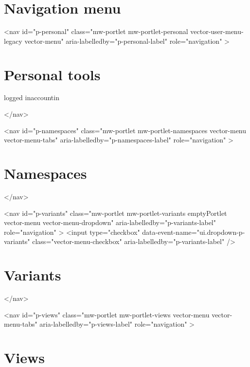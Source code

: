 \documentclass{article}\usepackage{titlesec}
\begin{document}
	



	\section{Navigation menu}
	
		<nav id="p-personal" class="mw-portlet mw-portlet-personal vector-user-menu-legacy vector-menu" aria-labelledby="p-personal-label" role="navigation" 
	 >
	\section{Personal tools}
	
		
		\begin{itemize}\itemNot logged in\itemTalk\itemContributions\itemCreate account\itemLog in\end{itemize}
		
	
</nav>

		
			<nav id="p-namespaces" class="mw-portlet mw-portlet-namespaces vector-menu vector-menu-tabs" aria-labelledby="p-namespaces-label" role="navigation" 
	 >
	\section{Namespaces}
	
		
		\begin{itemize}\itemArticle\itemTalk\end{itemize}
		
	
</nav>

			<nav id="p-variants" class="mw-portlet mw-portlet-variants emptyPortlet vector-menu vector-menu-dropdown" aria-labelledby="p-variants-label" role="navigation" 
	 >
	<input type="checkbox"
		data-event-name="ui.dropdown-p-variants"
		class="vector-menu-checkbox" aria-labelledby="p-variants-label" />
	\section{Variants}
	
		
		\begin{itemize}\end{itemize}
		
	
</nav>

		
		
			<nav id="p-views" class="mw-portlet mw-portlet-views vector-menu vector-menu-tabs" aria-labelledby="p-views-label" role="navigation" 
	 >
	\section{Views}
	
\end{document}

